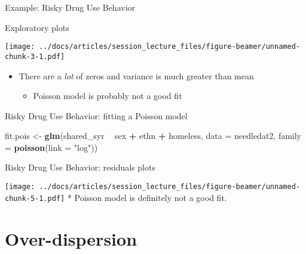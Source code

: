 \documentclass[
  ignorenonframetext,
]{beamer}
\newenvironment{Shaded}{\begin{snugshade}}{\end{snugshade}}
\newcommand{\DataTypeTok}[1]{\textcolor[rgb]{0.13,0.29,0.53}{#1}}
\newcommand{\KeywordTok}[1]{\textcolor[rgb]{0.13,0.29,0.53}{\textbf{#1}}}
\newcommand{\NormalTok}[1]{#1}
\newcommand{\OperatorTok}[1]{\textcolor[rgb]{0.81,0.36,0.00}{\textbf{#1}}}
\newcommand{\StringTok}[1]{\textcolor[rgb]{0.31,0.60,0.02}{#1}}
\providecommand{\tightlist}{%
  \setlength{\itemsep}{0pt}\setlength{\parskip}{0pt}}
\begin{document}
\begin{frame}{Example: Risky Drug Use Behavior}
\protect\hypertarget{example-risky-drug-use-behavior-1}{}

Exploratory plots

\texttt{[image: ../docs/articles/session\_lecture\_files/figure-beamer/unnamed-chunk-3-1.pdf]}

\begin{itemize}
\tightlist
\item
  There are a \emph{lot} of zeros and variance is much greater than mean

  \begin{itemize}
  \tightlist
  \item
    Poisson model is probably not a good fit
  \end{itemize}
\end{itemize}

\end{frame}

\begin{frame}[fragile]{Risky Drug Use Behavior: fitting a Poisson model}
\protect\hypertarget{risky-drug-use-behavior-fitting-a-poisson-model}{}

\begin{Shaded}
\begin{Highlighting}[]
\NormalTok{fit.pois <-}\StringTok{ }\KeywordTok{glm}\NormalTok{(shared_syr }\OperatorTok{~}\StringTok{ }\NormalTok{sex }\OperatorTok{+}\StringTok{ }\NormalTok{ethn }\OperatorTok{+}\StringTok{ }\NormalTok{homeless,}
                \DataTypeTok{data =}\NormalTok{ needledat2,}
                \DataTypeTok{family =} \KeywordTok{poisson}\NormalTok{(}\DataTypeTok{link =} \StringTok{"log"}\NormalTok{))}
\end{Highlighting}
\end{Shaded}

\end{frame}

\begin{frame}{Risky Drug Use Behavior: residuals plots}
\protect\hypertarget{risky-drug-use-behavior-residuals-plots}{}

\texttt{[image: ../docs/articles/session\_lecture\_files/figure-beamer/unnamed-chunk-5-1.pdf]}
* Poisson model is definitely not a good fit.

\end{frame}

\hypertarget{over-dispersion}{%
\section{Over-dispersion}\label{over-dispersion}}
\end{document}
